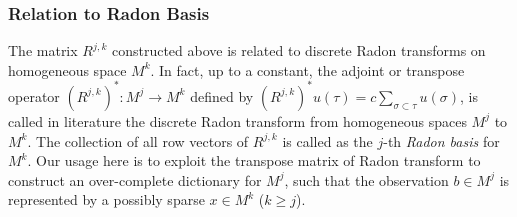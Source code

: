 \documentclass{article}
\begin{document}


\subsubsection{Relation to Radon Basis}
The matrix $R^{j,k}$ constructed above is related to discrete Radon transforms on homogeneous space $M^k$. In fact, up to a 
constant, the adjoint or transpose operator $(R^{j,k})^*: M^j \to M^k$ defined by $(R^{j,k})^*u (\tau) = c \sum_{\sigma\subset\tau}  u(\sigma)$, is called in literature \cite{Persi88} the discrete Radon transform from homogeneous spaces 
$M^j$ to $M^k$. The collection of all row vectors of $R^{j,k}$ is called as the $j$-th \emph{Radon basis} for $M^k$. 
Our usage here is to exploit the transpose matrix of Radon transform to construct an over-complete dictionary for $M^j$, 
such that the observation $b\in M^j$ is represented by a possibly sparse $x\in M^k$ ($k\geq j$).

\end{document}
